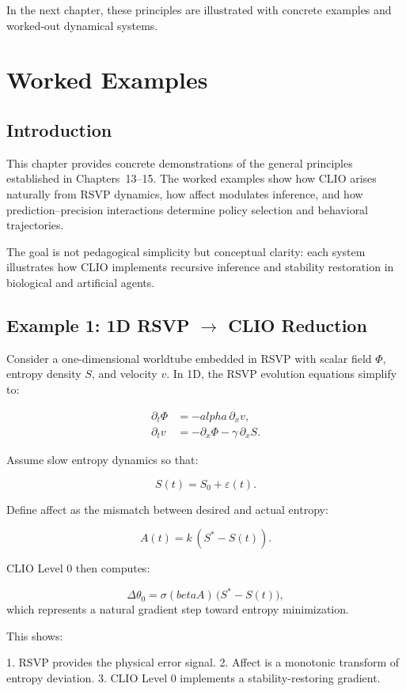 \documentclass[12pt,oneside]{book}
\theoremstyle{plain}
\theoremstyle{definition}
\def\alpha{alpha}%
\def\beta{beta}%
\begin{document}
In the next chapter, these principles are illustrated with concrete examples and
worked-out dynamical systems.

\chapter{Worked Examples}

\section{Introduction}

This chapter provides concrete demonstrations of the general principles
established in Chapters~13–15.
The worked examples show how CLIO arises naturally from RSVP dynamics, how
affect modulates inference, and how prediction–precision interactions determine
policy selection and behavioral trajectories.

The goal is not pedagogical simplicity but conceptual clarity: each system
illustrates how CLIO implements recursive inference and stability restoration in
biological and artificial agents.

\section{Example 1: 1D RSVP $\rightarrow$ CLIO Reduction}

Consider a one-dimensional worldtube embedded in RSVP with scalar field $\Phi$,
entropy density $S$, and velocity $v$.
In 1D, the RSVP evolution equations simplify to:

\begin{align}
\partial_t \Phi &= - \alpha \, \partial_x v, \\
\partial_t v &= - \partial_x \Phi - \gamma \, \partial_x S.
\end{align}

Assume slow entropy dynamics so that:

\[
S(t) = S_0 + \varepsilon(t).
\]

Define affect as the mismatch between desired and actual entropy:

\[
A(t) = k \, (S^\ast - S(t)).
\]

CLIO Level 0 then computes:

\[
\Delta \theta_0
= \sigma(\beta A) \, \big(S^\ast - S(t)\big),
\]
which represents a natural gradient step toward entropy minimization.

This shows:

1. RSVP provides the physical error signal.
2. Affect is a monotonic transform of entropy deviation.
3. CLIO Level 0 implements a stability-restoring gradient.
\end{document}
